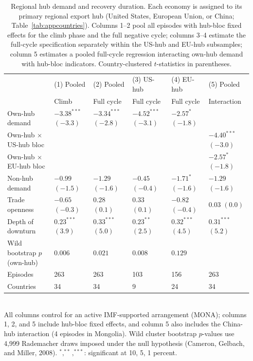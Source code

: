 \begin{table}[t]
\centering\small
\caption{Regional hub demand and recovery duration. Each economy is assigned to its primary regional export hub (United States, European Union, or China; Table~\ref{tab:appcountries}). Columns 1--2 pool all episodes with hub-bloc fixed effects for the climb phase and the full negative cycle; columns 3--4 estimate the full-cycle specification separately within the US-hub and EU-hub subsamples; column 5 estimates a pooled full-cycle regression interacting own-hub demand with hub-bloc indicators. Country-clustered $t$-statistics in parentheses.}
\label{tab:hubs}
\begin{tabularx}{\textwidth}{@{}lYYYYY@{}}
\toprule
 & (1) Pooled & (2) Pooled & (3) US-hub & (4) EU-hub & (5) Pooled \\
 & Climb & Full cycle & Full cycle & Full cycle & Interaction \\ \midrule
Own-hub demand & $-3.38^{***}$ {\scriptsize$(-3.3)$} & $-3.34^{***}$ {\scriptsize$(-2.8)$} & $-4.52^{***}$ {\scriptsize$(-3.1)$} & $-2.57^{*}$ {\scriptsize$(-1.8)$} & \\
Own-hub $\times$ US-hub bloc & & & & & $-4.40^{***}$ {\scriptsize$(-3.0)$} \\
Own-hub $\times$ EU-hub bloc & & & & & $-2.57^{*}$ {\scriptsize$(-1.8)$} \\
Non-hub demand & $-0.99$ {\scriptsize$(-1.5)$} & $-1.29$ {\scriptsize$(-1.6)$} & $-0.45$ {\scriptsize$(-0.4)$} & $-1.71^{*}$ {\scriptsize$(-1.6)$} & $-1.29$ {\scriptsize$(-1.6)$} \\
Trade openness & $-0.65$ {\scriptsize$(-0.3)$} & $0.28$ {\scriptsize$(0.1)$} & $0.33$ {\scriptsize$(0.1)$} & $-0.82$ {\scriptsize$(-0.4)$} & $0.03$ {\scriptsize$(0.0)$} \\
Depth of downturn & $0.23^{***}$ {\scriptsize$(3.9)$} & $0.33^{***}$ {\scriptsize$(5.0)$} & $0.23^{**}$ {\scriptsize$(2.5)$} & $0.32^{***}$ {\scriptsize$(4.5)$} & $0.31^{***}$ {\scriptsize$(5.2)$} \\
\midrule
Wild bootstrap $p$ (own-hub) & $0.006$ & $0.021$ & $0.008$ & $0.129$ & \\
Episodes & 263 & 263 & 103 & 156 & 263 \\
Countries & 34 & 34 & 9 & 24 & 34 \\
\bottomrule
\end{tabularx}
\\[2pt]\footnotesize{All columns control for an active IMF-supported arrangement (MONA); columns 1, 2, and 5 include hub-bloc fixed effects, and column 5 also includes the China-hub interaction (4 episodes in Mongolia). Wild cluster bootstrap $p$-values use 4,999 Rademacher draws imposed under the null hypothesis (Cameron, Gelbach, and Miller, 2008). $^{*},^{**},^{***}$: significant at 10, 5, 1 percent.}
\end{table}
